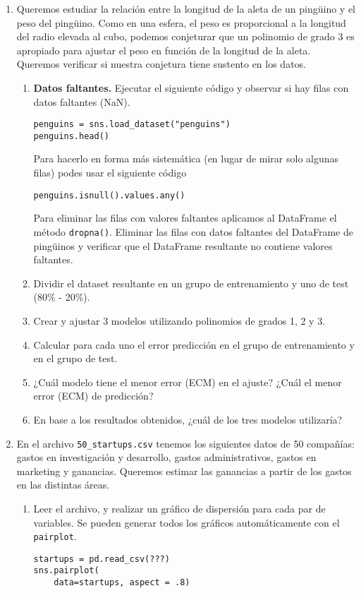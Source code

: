 \documentclass[a4paper,11pt]{article}
\theoremstyle{definition}
\begin{document}
\begin{enumerate}

\item \label{ejer:grado3} Queremos estudiar la relación entre la longitud de la aleta de un ping\"uino y el peso del ping\"uino. Como en una esfera, el peso es proporcional a la longitud del radio elevada al cubo, podemos conjeturar que un polinomio de grado 3 es apropiado para ajustar el peso en función de la longitud de la aleta. Queremos verificar si nuestra conjetura tiene sustento en los datos.
\begin{enumerate}
\item \label{item:nan} \textbf{Datos faltantes.} Ejecutar el siguiente c\'odigo y observar si hay filas con datos faltantes (NaN).
\begin{lstlisting}
penguins = sns.load_dataset("penguins")
penguins.head()
\end{lstlisting}

Para hacerlo en forma más sistemática (en lugar de mirar solo algunas filas) podes usar el siguiente código
\begin{lstlisting}
penguins.isnull().values.any()
\end{lstlisting}

Para eliminar las filas con valores faltantes aplicamos al DataFrame el método \lstinline{dropna()}. Eliminar las filas con datos faltantes del DataFrame de ping\"uinos y verificar que el DataFrame resultante no contiene valores faltantes.

\item Dividir el dataset resultante  en un grupo de entrenamiento y uno de test (80\% - 20\%).
\item Crear y ajustar 3 modelos utilizando polinomios de grados 1, 2 y 3.
\item Calcular para cada uno el error predicción en el grupo de entrenamiento y en el grupo de test.
\item ¿Cuál modelo tiene el menor error (ECM) en el ajuste? ¿Cuál el menor error (ECM) de predicción?
\item En base a los resultados obtenidos, ¿cu\'al de los tres modelos utilizaría?
\end{enumerate}

\item En el archivo \lstinline{50_startups.csv} tenemos los siguientes datos de 50 compa\~n\'ias: gastos en investigación y desarrollo, gastos administrativos, gastos en marketing y ganancias. Queremos estimar las ganancias a partir de los gastos en las distintas áreas.
\begin{enumerate}
\item Leer el archivo, y realizar un gráfico de dispersión para cada par de variables. Se pueden generar todos los gráficos automáticamente con el \lstinline{pairplot}.
\begin{lstlisting}
startups = pd.read_csv(???)
sns.pairplot(
    data=startups, aspect = .8)
\end{lstlisting}


\end{enumerate}
\end{enumerate}
\end{document}
